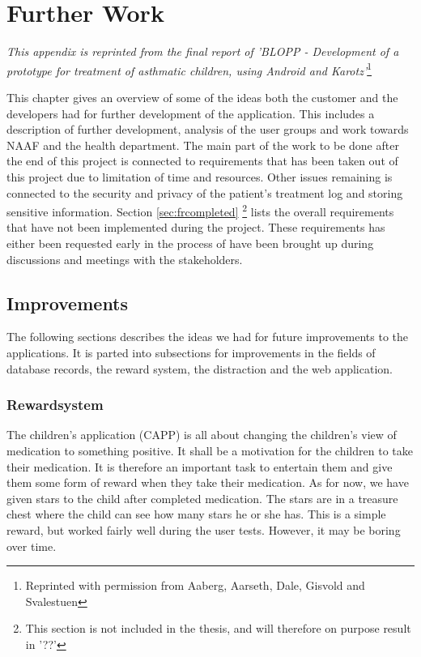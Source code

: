 \chapter{Further Work}
\label{app:furtherWork}


\emph{This appendix is reprinted from the final report of 'BLOPP - Development of a prototype for treatment of asthmatic children, using Android and Karotz'}\footnote{Reprinted with permission from Aaberg, Aarseth, Dale, Gisvold and Svalestuen} \cite{CustomerDriven}


This chapter gives an overview of some of the ideas both the customer and the developers had for further development of the application. This includes a description of further development, analysis of the user groups and work towards NAAF and the health department.
The main part of the work to be done after the end of this project is connected to requirements that has been taken out of this project due to limitation of time and resources. Other issues remaining is connected to the security and privacy of the patient's treatment log and storing sensitive information.
Section \ref{sec:frcompleted} \footnote{This section is not included in the thesis, and will therefore on purpose result in '??'} lists the overall requirements that have not been implemented during the project. These requirements has either been requested early in the process of have been brought up during discussions and meetings with the stakeholders. 


\section{Improvements}
\label{sec:Improvements}
The following sections describes the ideas we had for future improvements to the applications. It is parted into subsections for improvements in the fields of database records, the reward system, the distraction and the web application.

%
%

\subsection{Rewardsystem}
The children's application (CAPP) is all about changing the children's view of medication to something positive. It shall be a motivation for the children to take their medication. It is therefore an important task to entertain them and give them some form of reward when they take their medication. As for now, we have given stars to the child after completed medication. The stars are in a treasure chest where the child can see how many stars he or she has. This is a simple reward, but worked fairly well during the user tests. However, it may be boring over time. 

